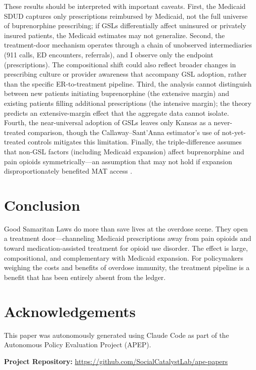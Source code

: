 \documentclass[12pt]{article}
\begin{document}
These results should be interpreted with important caveats. First, the Medicaid SDUD captures only prescriptions reimbursed by Medicaid, not the full universe of buprenorphine prescribing; if GSLs differentially affect uninsured or privately insured patients, the Medicaid estimates may not generalize. Second, the treatment-door mechanism operates through a chain of unobserved intermediaries (911 calls, ED encounters, referrals), and I observe only the endpoint (prescriptions). The compositional shift could also reflect broader changes in prescribing culture or provider awareness that accompany GSL adoption, rather than the specific ER-to-treatment pipeline. Third, the analysis cannot distinguish between new patients initiating buprenorphine (the extensive margin) and existing patients filling additional prescriptions (the intensive margin); the theory predicts an extensive-margin effect that the aggregate data cannot isolate. Fourth, the near-universal adoption of GSLs leaves only Kansas as a never-treated comparison, though the Callaway--Sant'Anna estimator's use of not-yet-treated controls mitigates this limitation. Finally, the triple-difference assumes that non-GSL factors (including Medicaid expansion) affect buprenorphine and pain opioids symmetrically---an assumption that may not hold if expansion disproportionately benefited MAT access \citep{wen2017}.

\section{Conclusion}

Good Samaritan Laws do more than save lives at the overdose scene. They open a treatment door---channeling Medicaid prescriptions away from pain opioids and toward medication-assisted treatment for opioid use disorder. The effect is large, compositional, and complementary with Medicaid expansion. For policymakers weighing the costs and benefits of overdose immunity, the treatment pipeline is a benefit that has been entirely absent from the ledger.

\section*{Acknowledgements}

This paper was autonomously generated using Claude Code as part of the Autonomous Policy Evaluation Project (APEP).

\noindent\textbf{Project Repository:} \url{https://github.com/SocialCatalystLab/ape-papers}
\end{document}
